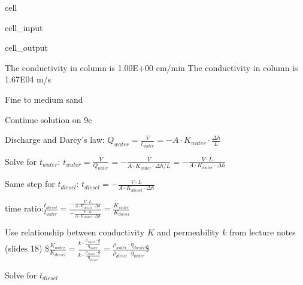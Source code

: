 \documentclass[letterpaper,10pt,english]{jupyterBook}
\begin{document}
\begin{sphinxuseclass}{cell}
\begin{sphinxVerbatimInput}
\begin{sphinxuseclass}{cell_input}
\end{sphinxuseclass}\end{sphinxVerbatimInput}
\begin{sphinxVerbatimOutput}

\begin{sphinxuseclass}{cell_output}
\begin{sphinxVerbatim}[commandchars=\\\{\}]
The conductivity in column is 1.00E+00 cm/min
The conductivity in column is 1.67E\PYGZhy{}04 m/s 

Fine to medium sand
\end{sphinxVerbatim}

\end{sphinxuseclass}\end{sphinxVerbatimOutput}

\end{sphinxuseclass}
\sphinxAtStartPar
Continue solution on 9c

\sphinxAtStartPar
Discharge and Darcy’s law: \(Q_{water} = \frac{V}{t_{water}}=-A\cdot K_{water}\cdot\frac{\Delta h}{L}\)

\sphinxAtStartPar
Solve for \(t_{water}\):   \(t_{water} = \frac{V}{Q_{water}}=-\frac{V}{A\cdot K_{water}\cdot\Delta h/L} = -\frac{V\cdot L}{A\cdot K_{water}\cdot\Delta h}\)

\sphinxAtStartPar
Same step for \(t_{diesel}\):   \(t_{diesel}  = -\frac{V\cdot L}{A\cdot K_{diesel}\cdot\Delta h}\)

\sphinxAtStartPar
time ratio:\(\frac{t_{diesel}}{t_{water}} = \frac{-\frac{V\cdot L}{A\cdot K_{diesel}\cdot\Delta h}}{-\frac{V\cdot L}{A\cdot K_{water}\cdot\Delta h}} = \frac{K_{water}}{K_{diesel}}\)

\sphinxAtStartPar
Use relationship between conductivity \(K\) and permeability \(k\) from lecture notes (slides 18)
\$\(\frac{K_{water}}{K_{diesel}} = \frac{k\cdot \frac{\rho_{water}\cdot g}{\eta_{water}}}{k\cdot \frac{\rho_{diesel}\cdot g}{\eta_{diesel}}} = \frac{\rho_{water}\cdot\eta_{diesel}}{\rho_{diesel}\cdot\eta_{water}}\)\$

\sphinxAtStartPar
Solve for \(t_{diesel}\)
\end{document}

